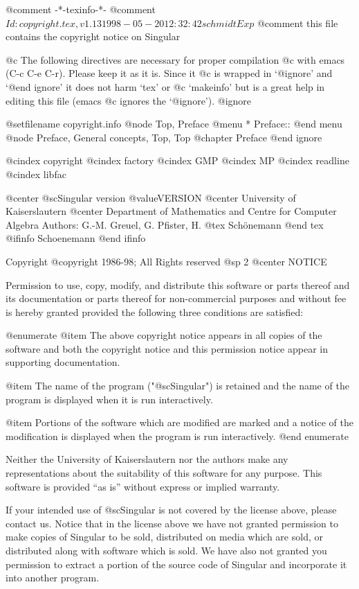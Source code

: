 @comment -*-texinfo-*-
@comment $Id: copyright.tex,v 1.13 1998-05-20 12:32:42 schmidt Exp $
@comment this file contains the copyright notice on Singular

@c The following directives are necessary for proper compilation
@c with emacs (C-c C-e C-r).  Please keep it as it is.  Since it
@c is wrapped in `@ignore' and `@end ignore' it does not harm `tex' or
@c `makeinfo' but is a great help in editing this file (emacs
@c ignores the `@ignore').
@ignore

@setfilename copyright.info
@node Top, Preface
@menu
* Preface::
@end menu
@node Preface, General concepts, Top, Top
@chapter Preface
@end ignore

@cindex copyright
@cindex factory
@cindex GMP
@cindex MP
@cindex readline
@cindex libfac

@center @sc{Singular} version @value{VERSION}
@center University of Kaiserslautern
@center Department of Mathematics and Centre for Computer Algebra
Authors: G.-M. Greuel, G. Pfister, H.
@tex
Sch\"onemann
@end tex
@ifinfo
Schoenemann
@end ifinfo

Copyright @copyright{} 1986-98; All Rights reserved
@sp 2
                                @center NOTICE

Permission to use, copy, modify, and distribute this software or parts
thereof and its documentation or parts thereof for non-commercial
purposes and without fee is hereby granted provided the following three
conditions are satisfied:

@enumerate
@item
The above copyright notice appears in all copies of the software
and both the copyright notice and this permission notice
appear in supporting documentation.

@item
The name of the program ("@sc{Singular}") is retained and the name of
the program is displayed when it is run interactively.

@item
Portions of the software which are modified are marked and a notice of the
modification is displayed when the program is run interactively.
@end enumerate

Neither the University of Kaiserslautern nor the authors make any
representations about the suitability of this software for any
purpose.  This software is provided ``as is'' without express or
implied warranty.

If your intended use of @sc{Singular} is not covered by the license above,
please contact us.  Notice that in the license above we have not
granted permission to make copies of Singular to be sold, distributed
on media which are sold, or distributed along with software which is
sold. We have also not granted you permission to extract a portion
of the source code of Singular and incorporate it into another program.

